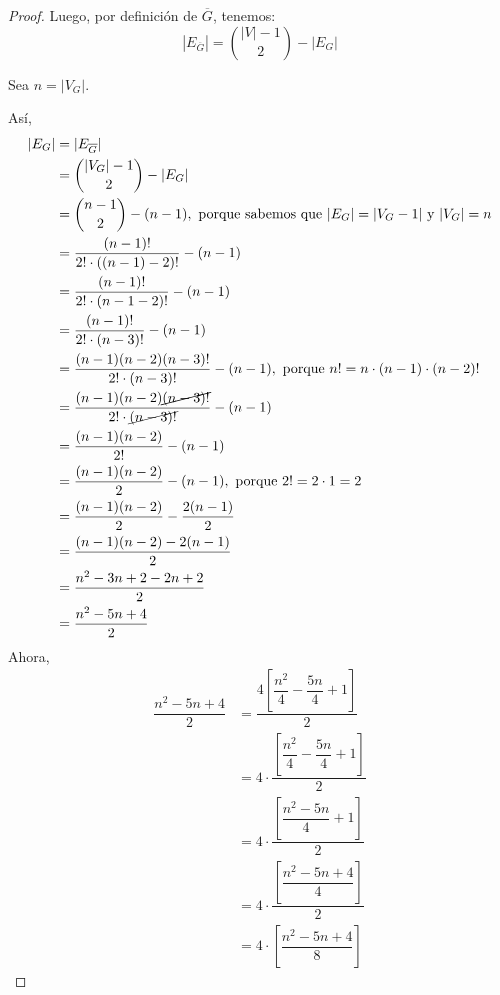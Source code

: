 \documentclass{article}
\begin{document}
\begin{enumerate}
\begin{enumerate}
\begin{proof}
        Luego, por definición de $\overline{G}$, tenemos:
        $$|E_{\overline{G}}| = \binom{|V| - 1}{2} - |E_{G}|$$

        Sea $n = |V_{G}|$.

        Así,
        \begin{align*}
          |E_{G}|
          & = |E_{\overline{G}}| \\
          & = \binom{|V_{G}| - 1}{2} - |E_{G}| \\
          & =  \binom{n - 1}{2} - (n - 1), \text{ porque sabemos que $|E_{G}| = |V_{G} - 1|$ y $|V_{G}| = n$} \\
          & = \dfrac{(n - 1)!}{2! \cdot ((n - 1) - 2)!} - (n - 1) \\
          & = \dfrac{(n - 1)!}{2! \cdot (n - 1 - 2)!} - (n - 1) \\
          & = \dfrac{(n - 1)!}{2! \cdot (n - 3)!} - (n - 1) \\
          & = \dfrac{(n - 1)(n - 2)(n - 3)!}{2! \cdot (n - 3)!} - (n - 1), \text{ porque $n! = n \cdot (n - 1) \cdot (n - 2)!$} \\
          & = \dfrac{(n - 1)(n - 2) \cancel{(n - 3)!}}{2! \cdot \cancel{(n - 3)!}} - (n - 1) \\
          & = \dfrac{(n - 1)(n - 2)}{2!} - (n - 1) \\
          & = \dfrac{(n - 1)(n - 2)}{2} - (n - 1), \text{ porque $2! = 2 \cdot 1 = 2$} \\
          & = \dfrac{(n - 1)(n - 2)}{2} - \dfrac{2(n - 1)}{2} \\
          & = \dfrac{(n - 1)(n - 2) - 2(n - 1)}{2} \\
          & = \dfrac{n^{2} - 3n + 2 - 2n + 2}{2} \\
          & = \dfrac{n^{2} - 5n + 4}{2}
        \end{align*}
        Ahora,
        \begin{align*}
          \dfrac{n^{2} - 5n + 4}{2}
          & = \dfrac{4 \left[\dfrac{n^{2}}{4} - \dfrac{5n}{4} + 1 \right]}{2} \\
          & = 4 \cdot \dfrac{\left[\dfrac{n^{2}}{4} - \dfrac{5n}{4} + 1 \right]}{2} \\
          & = 4 \cdot \dfrac{\left[\dfrac{n^{2} - 5n}{4} + 1 \right]}{2} \\
          & = 4 \cdot \dfrac{\left[\dfrac{n^{2} - 5n + 4}{4} \right]}{2} \\
          & = 4 \cdot \left[\dfrac{n^{2} - 5n + 4}{8} \right]
        \end{align*}


\end{proof}
\end{enumerate}
\end{enumerate}
\end{document}
